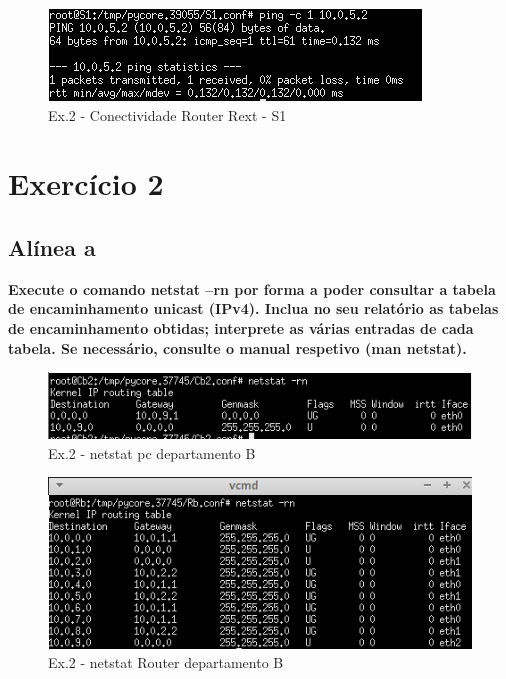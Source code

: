 \documentclass[a4paper]{report}
\begin{document}
\begin{figure}[H]
    \centering 
    \includegraphics[width=\textwidth]{images/RextPing.png}
    \caption{Ex.2 - Conectividade Router Rext - S1}
    \label{fig:RextPing}
\end{figure}

\section{Exercício 2}

\subsection{Alínea a}
\textbf{Execute o comando netstat –rn por forma a poder consultar a tabela de
encaminhamento unicast (IPv4). Inclua no seu relatório as tabelas de encaminhamento
obtidas; interprete as várias entradas de cada tabela. Se necessário, consulte o manual
respetivo (man netstat).}

\begin{figure}[H]
    \centering 
    \includegraphics[width=\textwidth]{images/netstatPcEx2P2.png}
    \caption{Ex.2 - netstat pc departamento B}
    \label{fig:netstatPcEx2P2}
\end{figure}

\begin{figure}[H]
    \centering 
    \includegraphics[width=\textwidth]{images/netstatRouterEx2P2.png}
    \caption{Ex.2 - netstat Router departamento B}
    \label{fig:netstatRouterEx2P2}
\end{figure}
\end{document}

